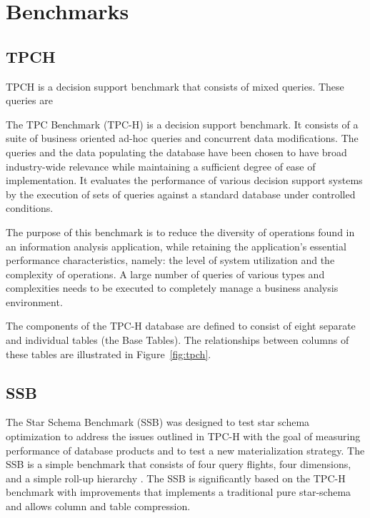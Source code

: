 \section{Benchmarks}
\label{sec:bench}

\subsection{TPCH}

TPCH is a decision support benchmark that consists of mixed queries. These queries are 

The TPC Benchmark (TPC-H) is a decision support benchmark. It consists of a suite of business oriented ad-hoc queries and concurrent data modifications. The queries and the data populating the database have been chosen to have broad industry-wide relevance while maintaining a sufficient degree of ease of implementation. It  evaluates the performance of various decision support systems by the execution of sets of queries against a standard database under controlled conditions.

The purpose of this benchmark is to reduce the diversity of operations found in an information analysis application, while retaining the application's essential performance characteristics, namely: the level of system utilization and the complexity  of  operations.  A  large  number  of  queries  of  various  types  and  complexities  needs  to  be  executed  to completely  manage  a  business  analysis  environment.

The  components  of  the  TPC-H  database  are  defined  to  consist  of  eight  separate  and  individual  tables  (the  Base Tables). The relationships between columns of these tables are illustrated in Figure~\ref{fig:tpch}.




\subsection{SSB}

The Star Schema Benchmark (SSB) was designed to test star schema optimization to address the issues outlined in TPC-H with the goal of measuring performance of database  products  and  to  test  a  new  materialization  strategy. The  SSB  is  a  simple  benchmark  that  consists  of  four  query flights,  four  dimensions,  and  a  simple  roll-up  hierarchy . The SSB is significantly based on the TPC-H benchmark with improvements  that  implements  a  traditional  pure  star-schema and allows column and table compression.

